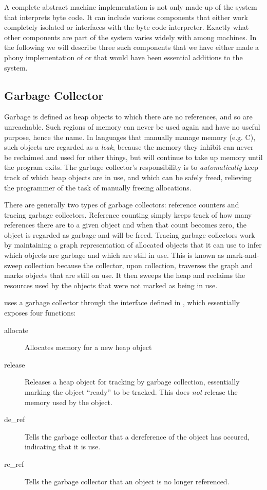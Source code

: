 A complete abstract machine implementation is not only made up of the system
that interprets byte code. It can include various components that either work
completely isolated or interfaces with the byte code interpreter. Exactly what
other components are part of the system varies widely with among machines. In
the following we will describe three such components that we have either made a
phony implementation of or that would have been essential additions to the
system.

\subsection{Garbage Collector}
Garbage is defined as heap objects to which there are no references, and so are
unreachable. Such regions of memory can never be used again and have no useful
purpose, hence the name. In languages that manually manage memory (e.g. C), such
objects are regarded as a \textit{leak}, because the memory they inhibit can
never be reclaimed and used for other things, but will continue to take up
memory until the program exits. The garbage collector's responsibility is to
\textit{automatically} keep track of which heap objects are in use, and which
can be safely freed, relieving the programmer of the task of manually freeing
allocations.

There are generally two types of garbage collectors: reference counters and
tracing garbage collectors. Reference counting simply keeps track of how many
references there are to a given object and when that count becomes zero, the
object is regarded as garbage and will be freed. Tracing garbage collectors work
by maintaining a graph representation of allocated objects that it can use to
infer which objects are garbage and which are still in use. This is known as
mark-and-sweep collection because the collector, upon collection, traverses the
graph and marks objects that are still on use. It then sweeps the heap and
reclaims the resources used by the objects that were not marked as being in use.

\thename{} uses a garbage collector through the interface defined in
, which essentially exposes four functions:

\begin{description}
\item[allocate] Allocates memory for a new heap object
\item[release] Releases a heap object for tracking by garbage collection,
  essentially marking the object ``ready'' to be tracked. This does \textit{not}
  release the memory used by the object.
\item[de\_ref] Tells the garbage collector that a dereference of the object has
  occured, indicating that it is use.
\item[re\_ref] Tells the garbage collector that an object is no longer
  referenced.
\end{description}

